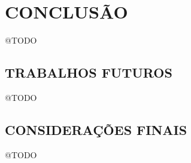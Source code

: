 \chapter{CONCLUSÃO}
\label{chap:conclusao}

@TODO

\section{TRABALHOS FUTUROS}
\label{sec:trabalhosFuturos}

@TODO

\section{CONSIDERAÇÕES FINAIS}
\label{sec:consideracoesFinais}

@TODO